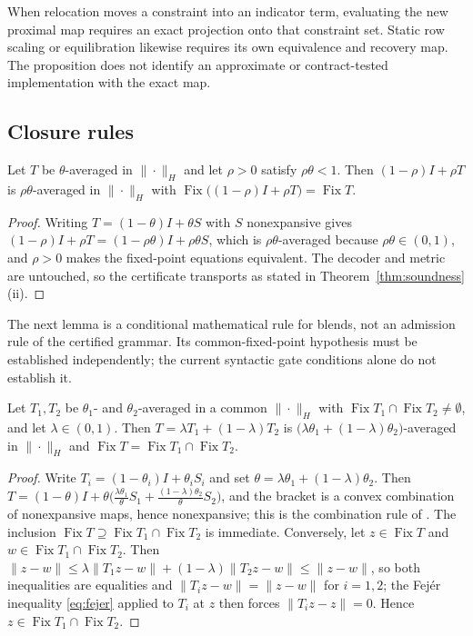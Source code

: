 When relocation moves a constraint into an indicator term, evaluating the
new proximal map requires an exact projection onto that constraint set.
Static row scaling or equilibration likewise requires its own equivalence
and recovery map. The proposition does not identify an approximate or
contract-tested implementation with the exact map.

\subsection{Closure rules}

\begin{lemma}[Relaxation]
\label{lem:relaxation}
Let $T$ be $\theta$-averaged in $\|\cdot\|_H$ and let $\rho>0$ satisfy
$\rho\theta<1$. Then $(1-\rho)I+\rho T$ is $\rho\theta$-averaged in
$\|\cdot\|_H$ with $\operatorname{Fix}\bigl((1-\rho)I+\rho
T\bigr)=\operatorname{Fix}T$.
\end{lemma}

\begin{proof}
Writing $T=(1-\theta)I+\theta S$ with $S$ nonexpansive gives
$(1-\rho)I+\rho T=(1-\rho\theta)I+\rho\theta S$, which is
$\rho\theta$-averaged because $\rho\theta\in(0,1)$, and $\rho>0$ makes the
fixed-point equations equivalent. The decoder and metric are untouched, so
the certificate transports as stated in Theorem~\ref{thm:soundness}(ii).
\end{proof}

The next lemma is a conditional mathematical rule for blends, not an
admission rule of the certified grammar. Its common-fixed-point hypothesis
must be established independently; the current syntactic gate conditions
alone do not establish it.

\begin{lemma}[Blends]
\label{lem:blend}
Let $T_1,T_2$ be $\theta_1$- and $\theta_2$-averaged in a common
$\|\cdot\|_H$ with
$\operatorname{Fix}T_1\cap\operatorname{Fix}T_2\neq\emptyset$, and let
$\lambda\in(0,1)$. Then $T=\lambda T_1+(1-\lambda)T_2$ is
$\bigl(\lambda\theta_1+(1-\lambda)\theta_2\bigr)$-averaged in $\|\cdot\|_H$
and $\operatorname{Fix}T=\operatorname{Fix}T_1\cap\operatorname{Fix}T_2$.
\end{lemma}

\begin{proof}
Write $T_i=(1-\theta_i)I+\theta_iS_i$ and set
$\theta=\lambda\theta_1+(1-\lambda)\theta_2$. Then
$T=(1-\theta)I+\theta\bigl(\tfrac{\lambda\theta_1}{\theta}S_1
+\tfrac{(1-\lambda)\theta_2}{\theta}S_2\bigr)$, and the bracket is a convex
combination of nonexpansive maps, hence nonexpansive; this is the
combination rule of \citet{CombettesYamada2015Compositions}. The inclusion
$\operatorname{Fix}T\supseteq\operatorname{Fix}T_1\cap\operatorname{Fix}T_2$
is immediate. Conversely, let $z\in\operatorname{Fix}T$ and
$w\in\operatorname{Fix}T_1\cap\operatorname{Fix}T_2$. Then
$\|z-w\|\leq\lambda\|T_1z-w\|+(1-\lambda)\|T_2z-w\|\leq\|z-w\|$, so both
inequalities are equalities and $\|T_iz-w\|=\|z-w\|$ for $i=1,2$; the
Fej\'er inequality \eqref{eq:fejer} applied to $T_i$ at $z$ then forces
$\|T_iz-z\|=0$. Hence $z\in\operatorname{Fix}T_1\cap\operatorname{Fix}T_2$.
\end{proof}

